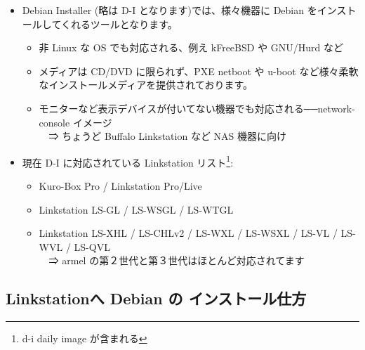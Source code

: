 \documentclass[mingoth,a4paper]{jsarticle}
\begin{document}
\begin{itemize}
\item Debian Installer (略は D-I となります)では、様々機器に Debian をインストールしてくれるツールとなります。
	\begin{itemize}
	\item 非 Linux な OS でも対応される、例え kFreeBSD や GNU/Hurd など
	\item メディアは CD/DVD に限られず、PXE netboot や u-boot など様々柔軟なインストールメディアを提供されております。
	\item モニターなど表示デバイスが付いてない機器でも対応される──network-console イメージ\\
	　⇒ ちょうど Buffalo Linkstation など NAS 機器に向け
	\end{itemize}
\item 現在 D-I に対応されている Linkstation リスト\footnote{d-i daily image が含まれる}:
	\begin{itemize}
	\item Kuro-Box Pro / Linkstation Pro/Live
	\item Linkstation LS-GL / LS-WSGL / LS-WTGL
	\item Linkstation LS-XHL / LS-CHLv2 / LS-WXL / LS-WSXL / LS-VL / LS-WVL / LS-QVL\\
	　⇒ armel の第２世代と第３世代はほとんど対応されてます
	\end{itemize}
\end{itemize}

\subsection{Linkstationへ Debian の インストール仕方}
\end{document}
